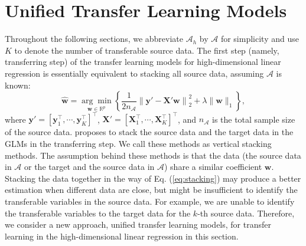 \documentclass[twoside,12pt]{article}
\newcommand{\mb}[1]{\boldsymbol{\mathbf{#1}}}
\begin{document}
	\section{Unified Transfer Learning Models}
	\label{sec: unified}
	Throughout the following sections,
	we abbreviate $\mathcal A_h$ by $\mathcal A$ for simplicity and use $K$ to denote the number of transferable source data.
	The first step (namely, transferring step) of the transfer learning models for high-dimensional linear regression \citep{Li2022} 
	 is essentially equivalent to stacking all source data, assuming $\mathcal{A}$ is known:
	\begin{equation}
		\label{eq:stacking}
	\hat{\mb w}=\underset{\mb w \in \mathbb{R}^{p}}{\arg \min }\left\{\frac{1}{2n_{\mathcal{A}}}\left\|\mb y'-\mb X' \mb w\right\|_{2}^{2}+\lambda\|\mb w\|_{1}\right\},
    \end{equation}
    where $\mb y'=[\mb y_1^\top,\cdots, \mb y_K^\top]^\top$, $\mb X'=[\mb X_1^\top,\cdots, \mb X_K^\top]^\top$, and $n_{\mathcal{A}}$ is the total sample size of the source data.
    \cite{tian2022transfer} proposes to stack the source data and the target data in the GLMs in the transferring step.
    We call these methods as vertical stacking methods.
    The assumption behind these methods is that the data (the source data in $\mathcal{A}$ or the target and the source data in $\mathcal{A}$) share a similar coefficient $\mb w$.
    Stacking the data together in the way of Eq. (\ref{eq:stacking}) may produce a better estimation when different data are close, but might be insufficient to identify the transferable variables in the source data.
    For example, we are unable to identify the transferable variables to the target data for the $k$-th source data.
    Therefore, we consider a new approach, unified transfer learning models, for transfer learning in the high-dimensional linear regression in this section.
    
     
\end{document}
